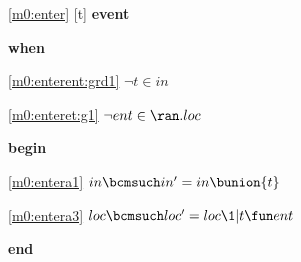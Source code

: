 \noindent \ref{m0:enter} [t] \textbf{event}
\begin{block}
  \item   \textbf{when}
  \begin{block}
  \item[ \eqref{m0:enterent:grd1} ]$\neg t \in in $ %
  \item[ \eqref{m0:enteret:g1} ]$\neg ent \in \ran.loc $ %
  \end{block}
  \item   \textbf{begin}
  \begin{block}
  \item[ \eqref{m0:entera1} ]$in \bcmsuch in' = in \bunion \{ t \} $ %
  \item[ \eqref{m0:entera3} ]$loc \bcmsuch loc' = loc \1| t \fun ent $ %
  \end{block}
  \item   \textbf{end} \\
\end{block}
